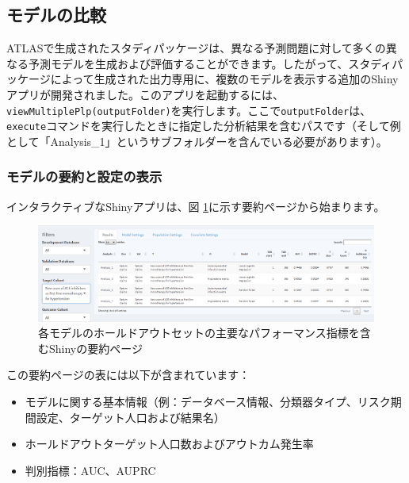 \documentclass[
  11pt]{book}
\providecommand{\tightlist}{%
  \setlength{\itemsep}{0pt}\setlength{\parskip}{0pt}}
\theoremstyle{definition}
\theoremstyle{definition}
\theoremstyle{definition}
\theoremstyle{definition}
\theoremstyle{remark}
\begin{document}
\subsection{モデルの比較}\label{ux30e2ux30c7ux30ebux306eux6bd4ux8f03}

ATLASで生成されたスタディパッケージは、異なる予測問題に対して多くの異なる予測モデルを生成および評価することができます。したがって、スタディパッケージによって生成された出力専用に、複数のモデルを表示する追加のShinyアプリが開発されました。このアプリを起動するには、\texttt{viewMultiplePlp(outputFolder)}を実行します。ここで\texttt{outputFolder}は、\texttt{execute}コマンドを実行したときに指定した分析結果を含むパスです（そして例として「Analysis\_1」というサブフォルダーを含んでいる必要があります）。

\subsubsection*{モデルの要約と設定の表示}\label{ux30e2ux30c7ux30ebux306eux8981ux7d04ux3068ux8a2dux5b9aux306eux8868ux793a}

インタラクティブなShinyアプリは、図 \ref{fig:multiShinySummary}に示す要約ページから始まります。

\begin{figure}

{\centering \includegraphics[width=1\linewidth]{images/PatientLevelPrediction/shiny/shinyFilter} 

}

\caption{各モデルのホールドアウトセットの主要なパフォーマンス指標を含むShinyの要約ページ}\label{fig:multiShinySummary}
\end{figure}

この要約ページの表には以下が含まれています：

\begin{itemize}
\tightlist
\item
  モデルに関する基本情報（例：データベース情報、分類器タイプ、リスク期間設定、ターゲット人口および結果名）
\item
  ホールドアウトターゲット人口数およびアウトカム発生率
\item
  判別指標：AUC、AUPRC
\end{itemize}
\end{document}

